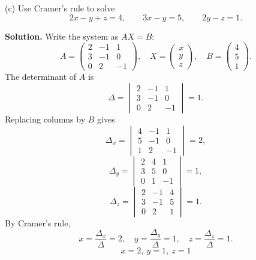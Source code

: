 \documentclass[11pt,a4paper]{article}
\newcommand{\question}[1]{\vspace{0.4em}\begin{tcolorbox}[colback=gray!8,colframe=black!55,title=Question,fonttitle=\bfseries]#1\end{tcolorbox}}
\newcommand{\answer}{\textbf{Solution. }}
\newcommand{\final}[1]{\[\boxed{#1}\]}
\begin{document}
\question{(c) Use Cramer's rule to solve
\[
2x-y+z=4,\qquad 3x-y=5,
\qquad 2y-z=1.
\]}
\answer
Write the system as $AX=B$:
\[
A=\begin{pmatrix}2&-1&1\\3&-1&0\\0&2&-1\end{pmatrix},
\quad
X=\begin{pmatrix}x\\y\\z\end{pmatrix},
\quad
B=\begin{pmatrix}4\\5\\1\end{pmatrix}.
\]
The determinant of $A$ is
\[
\Delta=\begin{vmatrix}2&-1&1\\3&-1&0\\0&2&-1\end{vmatrix}=1.
\]
Replacing columns by $B$ gives
\[
\Delta_x=\begin{vmatrix}4&-1&1\\5&-1&0\\1&2&-1\end{vmatrix}=2,
\]
\[
\Delta_y=\begin{vmatrix}2&4&1\\3&5&0\\0&1&-1\end{vmatrix}=1,
\]
\[
\Delta_z=\begin{vmatrix}2&-1&4\\3&-1&5\\0&2&1\end{vmatrix}=1.
\]
By Cramer's rule,
\[
x=\frac{\Delta_x}{\Delta}=2,
\quad
y=\frac{\Delta_y}{\Delta}=1,
\quad
z=\frac{\Delta_z}{\Delta}=1.
\]
\final{x=2,\ y=1,\ z=1}
\end{document}
